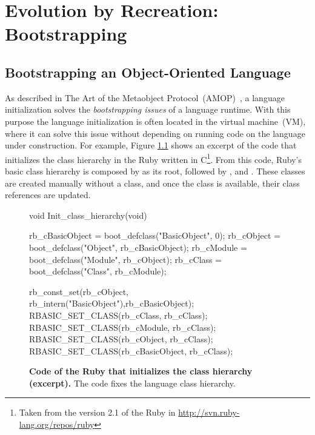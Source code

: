 
\part{Evolution by Recreation: Bootstrapping}
\chapter{Bootstrapping an Object-Oriented Language}
\introduction

As described in The Art of the Metaobject Protocol~(AMOP)~\cite{Kicz91a}, a language initialization solves the \emph{bootstrapping issues} of a language runtime. With this purpose the language initialization is often located in the virtual machine~(VM), where it can solve this issue without depending on running code on the language under construction. For example, Figure \ref{code:ruby_hierarchy} shows an excerpt of the code that initializes the class hierarchy in the Ruby \VM written in C\footnote{Taken from the version 2.1 of the Ruby \VM in \url{http://svn.ruby-lang.org/repos/ruby}}. From this code, Ruby's basic class hierarchy is composed by  as its root, followed by ,  and . These classes are created manually without a class, and once the class  is available, their class references are updated.

\begin{figure}[ht!]
\begin{code}
void Init_class_hierarchy(void) {
    rb_cBasicObject = boot_defclass("BasicObject", 0);
    rb_cObject = boot_defclass("Object", rb_cBasicObject);
    rb_cModule = boot_defclass("Module", rb_cObject);
    rb_cClass =  boot_defclass("Class",  rb_cModule);

    rb_const_set(rb_cObject, rb_intern("BasicObject"),rb_cBasicObject);
    RBASIC_SET_CLASS(rb_cClass, rb_cClass);
    RBASIC_SET_CLASS(rb_cModule, rb_cClass);
    RBASIC_SET_CLASS(rb_cObject, rb_cClass);
    RBASIC_SET_CLASS(rb_cBasicObject, rb_cClass);
}
\end{code}
\caption{\textbf{Code of the Ruby \VM that initializes the class hierarchy (excerpt).} The \VM code fixes the language class hierarchy.\label{code:ruby_hierarchy}}
\end{figure}



